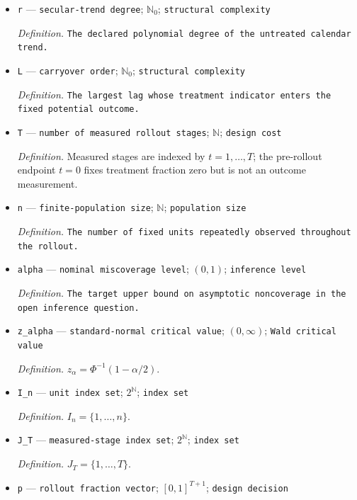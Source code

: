 \documentclass{article}
\begin{document}
\begin{itemize}
  \item \texttt{r} --- \texttt{secular-\allowbreak{}trend degree}; \(\mathbb N_0\); \texttt{structural complexity}
  \par\smallskip\noindent\emph{Definition.} \texttt{The declared polynomial degree of the untreated calendar trend.}
  \item \texttt{L} --- \texttt{carryover order}; \(\mathbb N_0\); \texttt{structural complexity}
  \par\smallskip\noindent\emph{Definition.} \texttt{The largest lag whose treatment indicator enters the fixed potential outcome.}
  \item \texttt{T} --- \texttt{number of measured rollout stages}; \(\mathbb N\); \texttt{design cost}
  \par\smallskip\noindent\emph{Definition.} Measured stages are indexed by \(t=1,\ldots,T\); the pre-rollout endpoint \(t=0\) fixes treatment fraction zero but is not an outcome measurement.
  \item \texttt{n} --- \texttt{finite-\allowbreak{}population size}; \(\mathbb N\); \texttt{population size}
  \par\smallskip\noindent\emph{Definition.} \texttt{The number of fixed units repeatedly observed throughout the rollout.}
  \item \texttt{alpha} --- \texttt{nominal miscoverage level}; \((0,1)\); \texttt{inference level}
  \par\smallskip\noindent\emph{Definition.} \texttt{The target upper bound on asymptotic noncoverage in the open inference question.}
  \item \texttt{z\_\allowbreak{}alpha} --- \texttt{standard-\allowbreak{}normal critical value}; \((0,\infty)\); \texttt{Wald critical value}
  \par\smallskip\noindent\emph{Definition.} \(z_\alpha=\Phi^{-1}(1-\alpha/2)\).
  \item \texttt{I\_\allowbreak{}n} --- \texttt{unit index set}; \(2^{\mathbb N}\); \texttt{index set}
  \par\smallskip\noindent\emph{Definition.} \(I_n=\{1,\ldots,n\}\).
  \item \texttt{J\_\allowbreak{}T} --- \texttt{measured-\allowbreak{}stage index set}; \(2^{\mathbb N}\); \texttt{index set}
  \par\smallskip\noindent\emph{Definition.} \(J_T=\{1,\ldots,T\}\).
  \item \texttt{p} --- \texttt{rollout fraction vector}; \([0,1]^{T+1}\); \texttt{design decision}

\end{itemize}
\end{document}
